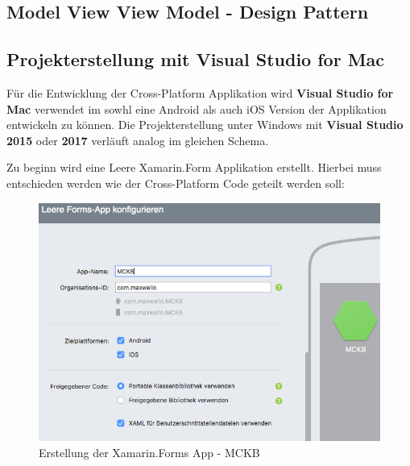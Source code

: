 \subsection{Model View View Model - Design Pattern}
\label{sec:xamarinformsmvvm}

\newpage
\subsection{Projekterstellung mit Visual Studio for Mac}
\label{sec:xamarincreateproject}

	Für die Entwicklung der Cross-Platform Applikation wird \textbf{Visual Studio for Mac} verwendet im sowhl eine Android als auch iOS Version der Applikation entwickeln zu können. Die Projekterstellung unter Windows mit \textbf{Visual Studio 2015} oder \textbf{2017} verläuft analog im gleichen Schema.

	Zu beginn wird eine Leere Xamarin.Form Applikation erstellt. Hierbei muss entschieden werden wie der Cross-Platform Code geteilt werden soll:

	\begin{figure}[h!]
		\centering
		\includegraphics[width=1\textwidth]{images/Project-Setup-one.png}
		\caption{Erstellung der Xamarin.Forms App - MCKB}
		\label{fig:xamarinformsprojectsetup}
	\end{figure}
























